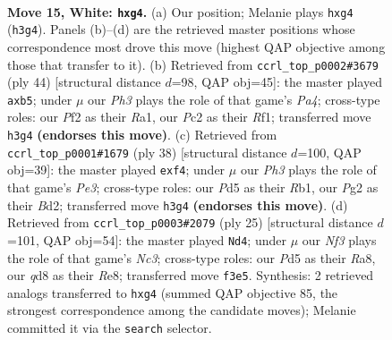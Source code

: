 \documentclass[11pt]{article}
\begin{document}
\clearpage

\begin{figure}[p]\centering
\begin{subfigure}{0.46\textwidth}\centering
\resizebox{\linewidth}{!}{%
\newchessgame
\chessboard[
  setfen={rnbqk2r/4b3/p2p4/1ppPpp1p/6p1/1B1P1N1P/PPPQ1PP1/R1B1RK2 w kq - 0 15},
  showmover=false,
  pgfstyle=straightmove, color=movearrow, markmove={h3-g4}
]}
\caption{}
\end{subfigure}\hfill
\begin{subfigure}{0.46\textwidth}\centering
\resizebox{\linewidth}{!}{%
\newchessgame
\chessboard[
  setfen={1rb1r1k1/2qn1p1p/p2p2p1/1ppP2B1/P2bPPP1/2N4P/1P1Q2BK/R4R2 w - - 3 23},
  showmover=false,
  pgfstyle=straightmove, color=movearrow, markmove={a4-b5}
]}
\caption{}
\end{subfigure}
\\[4pt]
\begin{subfigure}{0.46\textwidth}\centering
\resizebox{\linewidth}{!}{%
\newchessgame
\chessboard[
  setfen={1rb1q1k1/5rp1/pn1p3p/2pPp1b1/2B2p2/1P1PPP2/R1QBN1PP/1R4K1 w - - 0 20},
  showmover=false,
  pgfstyle=straightmove, color=movearrow, markmove={e3-f4}
]}
\caption{}
\end{subfigure}\hfill
\begin{subfigure}{0.46\textwidth}\centering
\resizebox{\linewidth}{!}{%
\newchessgame
\chessboard[
  setfen={r3r1k1/1bpqbppp/p1np4/1p1Pp3/8/PB1P1N1P/1PP2PP1/R1BQR1K1 b - - 0 13},
  showmover=false,
  pgfstyle=straightmove, color=movearrow, markmove={c6-d4}
]}
\caption{}
\end{subfigure}
\caption{\textbf{Move 15, White: \texttt{hxg4}.} (a) Our position; Melanie plays \texttt{hxg4} (\texttt{h3g4}). Panels (b)--(d) are the retrieved master positions whose correspondence most drove this move (highest QAP objective among those that transfer to it). (b) Retrieved from \texttt{ccrl\_top\_p0002\#3679} (ply 44) [structural distance $d$=98, QAP obj=45]: the master played \texttt{axb5}; under $\mu$ our \emph{Ph3} plays the role of that game's \emph{Pa4}; cross-type roles: our \emph{P}f2 as their \emph{R}a1, our \emph{P}c2 as their \emph{R}f1; transferred move \texttt{h3g4} \textbf{(endorses this move)}. (c) Retrieved from \texttt{ccrl\_top\_p0001\#1679} (ply 38) [structural distance $d$=100, QAP obj=39]: the master played \texttt{exf4}; under $\mu$ our \emph{Ph3} plays the role of that game's \emph{Pe3}; cross-type roles: our \emph{P}d5 as their \emph{R}b1, our \emph{P}g2 as their \emph{B}d2; transferred move \texttt{h3g4} \textbf{(endorses this move)}. (d) Retrieved from \texttt{ccrl\_top\_p0003\#2079} (ply 25) [structural distance $d$=101, QAP obj=54]: the master played \texttt{Nd4}; under $\mu$ our \emph{Nf3} plays the role of that game's \emph{Nc3}; cross-type roles: our \emph{P}d5 as their \emph{R}a8, our \emph{q}d8 as their \emph{R}e8; transferred move \texttt{f3e5}. Synthesis: 2 retrieved analogs transferred to \texttt{hxg4} (summed QAP objective 85, the strongest correspondence among the candidate moves); Melanie committed it via the \texttt{search} selector.}
\label{fig:thought-m28}
\end{figure}
\end{document}
